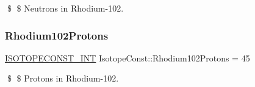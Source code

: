 \$ \$ Neutrons in Rhodium-\/102. \mbox{\label{group___isotope_const-_rhodium-_rh102_ga85660c6b64a1733313d85e3eb7ee130f}} 
\subsubsection{\texorpdfstring{Rhodium102\+Protons}{Rhodium102Protons}}
{\footnotesize\ttfamily \mbox{\hyperlink{group___isotope_const-_macros_ga5f18360b3e99483a35c32d789e62621c}{I\+S\+O\+T\+O\+P\+E\+C\+O\+N\+S\+T\+\_\+\+I\+NT}} Isotope\+Const\+::\+Rhodium102\+Protons = 45}

\$ \$ Protons in Rhodium-\/102. 